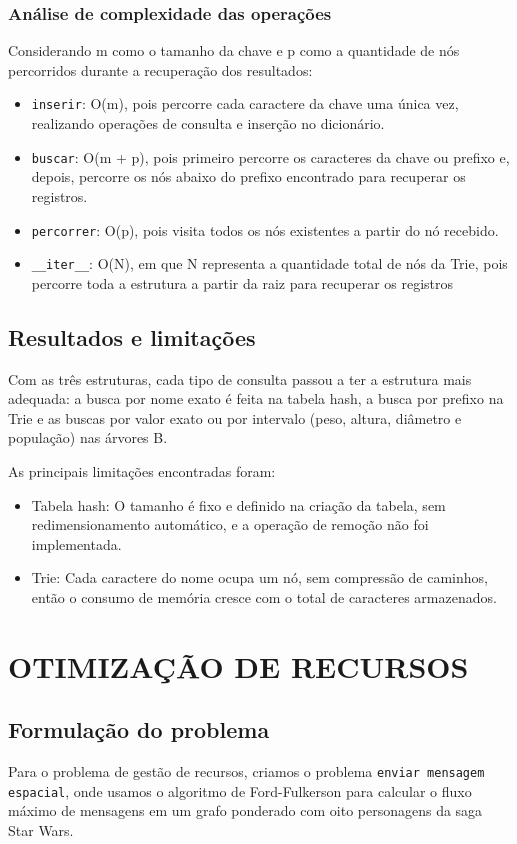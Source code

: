 \documentclass[12pt,a4paper]{article}
\begin{document}
\subsubsection{Análise de complexidade das operações}
Considerando m como o tamanho da chave e p como a quantidade de nós percorridos durante a recuperação dos resultados:
\begin{itemize}
    \item \texttt{inserir}: O(m), pois percorre cada caractere da chave uma única vez, realizando operações de consulta e inserção no dicionário.
    \item \texttt{buscar}: O(m + p), pois primeiro percorre os caracteres da chave ou prefixo e, depois, percorre os nós abaixo do prefixo encontrado para recuperar os registros.
    \item \texttt{percorrer}: O(p), pois visita todos os nós existentes a partir do nó recebido.
    \item \texttt{\_\_iter\_\_}: O(N), em que N representa a quantidade total de nós da Trie, pois percorre toda a estrutura a partir da raiz para recuperar os registros
\end{itemize}

\subsection{Resultados e limitações}
Com as três estruturas, cada tipo de consulta passou a ter a estrutura mais adequada: a busca por nome exato é feita na tabela hash, a busca por prefixo na Trie e as buscas por valor exato ou por intervalo (peso, altura, diâmetro e população) nas árvores B.

As principais limitações encontradas foram:
\begin{itemize}
    \item Tabela hash: O tamanho é fixo e definido na criação da tabela, sem redimensionamento automático, e a operação de remoção não foi implementada. 
    \item Trie: Cada caractere do nome ocupa um nó, sem compressão de caminhos, então o consumo de memória cresce com o total de caracteres armazenados.
\end{itemize}

\section{OTIMIZAÇÃO DE RECURSOS}

\subsection{Formulação do problema}
Para o problema de gestão de recursos, criamos o problema \texttt{enviar mensagem espacial}, onde usamos o algoritmo de Ford-Fulkerson para calcular o fluxo máximo de mensagens em um grafo ponderado com oito personagens da saga Star Wars.
\end{document}
